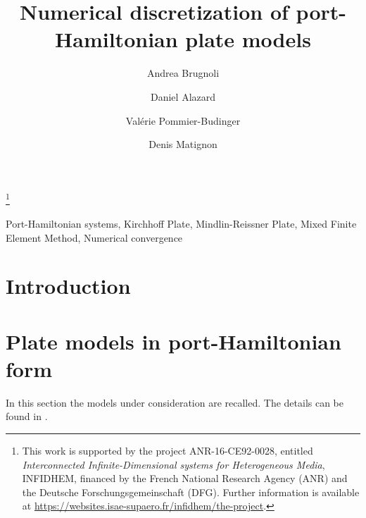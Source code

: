\documentclass{ifacconf}
\begin{document}
\begin{frontmatter}

\title{Numerical discretization of port-Hamiltonian plate models } 

\thanks[footnoteinfo]{This work is  supported by the project ANR-16-CE92-0028,
	entitled {\em Interconnected Infinite-Dimensional systems for Heterogeneous
		Media}, INFIDHEM, financed by the French National
	Research Agency (ANR) and the Deutsche Forschungsgemeinschaft (DFG). Further information is available at {\url{https://websites.isae-supaero.fr/infidhem/the-project}}.
	}

\author[ISAE]{Andrea Brugnoli}
\author[ISAE]{Daniel Alazard} 
\author[ISAE]{Val\'erie Pommier-Budinger}
\author[ISAE]{Denis Matignon}

\address[ISAE]{ISAE-SUPAERO, Universit\'e de Toulouse, France.\\
	10 Avenue Edouard Belin, BP-54032, 31055 Toulouse Cedex 4. \\
	Andrea.Brugnoli@isae.fr,  Daniel.Alazard@isae.fr, \\
	Valerie.Budinger@isae.fr, Denis.Matignon@isae.fr}

\begin{abstract}

\end{abstract}

\begin{keyword}
Port-Hamiltonian systems, Kirchhoff Plate, Mindlin-Reissner Plate, Mixed Finite Element Method, Numerical convergence
\end{keyword}

\end{frontmatter}

\section{Introduction}


\section{Plate models in port-Hamiltonian form}

In this section the models under consideration are recalled. The details can be found in  \cite{BRUGNOLI2019961,BRUGNOLI2019940}. 
\end{document}
